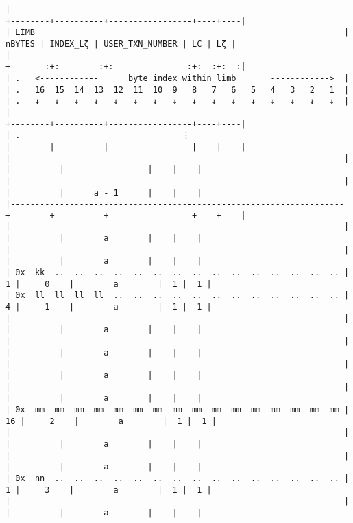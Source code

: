 \documentclass[varwidth=\maxdimen,margin=0.5cm,multi={verbatim}]{standalone}
\begin{document}
\begin{verbatim}
|--------------------------------------------------------------------+--------+----------+-----------------+----+----|
| LIMB                                                               | nBYTES | INDEX_Lζ | USER_TXN_NUMBER | LC | Lζ |
|--------------------------------------------------------------------+-------:+:--------:+:---------------:+:--:+:--:|
| .   <------------      byte index within limb       ------------>  |
| .   16  15  14  13  12  11  10  9   8   7   6   5   4   3   2   1  |
| .   ↓   ↓   ↓   ↓   ↓   ↓   ↓   ↓   ↓   ↓   ↓   ↓   ↓   ↓   ↓   ↓  |
|--------------------------------------------------------------------+--------+----------+-----------------+----+----|
| .                                 ⋮                                |        |          |                 |    |    |
|                                                                    |        |          |                 |    |    |
|                                                                    |        |          |      a - 1      |    |    |
|--------------------------------------------------------------------+--------+----------+-----------------+----+----|
|                                                                    |        |          |        a        |    |    |
|                                                                    |        |          |        a        |    |    |
| 0x  kk  ..  ..  ..  ..  ..  ..  ..  ..  ..  ..  ..  ..  ..  ..  .. |      1 |     0    |        a        |  1 |  1 |
| 0x  ll  ll  ll  ll  ..  ..  ..  ..  ..  ..  ..  ..  ..  ..  ..  .. |      4 |     1    |        a        |  1 |  1 |
|                                                                    |        |          |        a        |    |    |
|                                                                    |        |          |        a        |    |    |
|                                                                    |        |          |        a        |    |    |
|                                                                    |        |          |        a        |    |    |
| 0x  mm  mm  mm  mm  mm  mm  mm  mm  mm  mm  mm  mm  mm  mm  mm  mm |     16 |     2    |        a        |  1 |  1 |
|                                                                    |        |          |        a        |    |    |
|                                                                    |        |          |        a        |    |    |
| 0x  nn  ..  ..  ..  ..  ..  ..  ..  ..  ..  ..  ..  ..  ..  ..  .. |      1 |     3    |        a        |  1 |  1 |
|                                                                    |        |          |        a        |    |    |

\end{verbatim}
\end{document}
